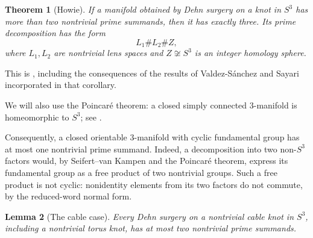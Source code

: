 \documentclass[11pt]{article}
\newtheorem{theorem}{Theorem}
\newtheorem{lemma}[theorem]{Lemma}
\begin{document}
\begin{theorem}[Howie]\label{thm:three}
If a manifold obtained by Dehn surgery on a knot in \(S^3\) has more
than two nontrivial prime summands, then it has exactly three.
Its prime decomposition has the form
\[
    L_1\#L_2\# Z,
\]
where \(L_1,L_2\) are nontrivial lens spaces and \(Z\not\cong S^3\) is
an integer homology sphere.
\end{theorem}

This is \cite[Corollary~5.3]{Howie}, including the consequences of the
results of Valdez-S\'anchez and Sayari incorporated in that corollary.


We will also use the Poincar\'e theorem: a closed simply connected
\(3\)-manifold is homeomorphic to \(S^3\); see \cite{MorganTian}.


Consequently, a closed orientable \(3\)-manifold with cyclic
fundamental group has at most one nontrivial prime summand.
Indeed, a decomposition into two non-\(S^3\) factors would, by
Seifert--van Kampen and the Poincar\'e theorem, express its fundamental
group as a free product of two nontrivial groups. Such a free product
is not cyclic: nonidentity elements from its two factors do not
commute, by the reduced-word normal form.

\begin{lemma}[The cable case]\label{lem:cable}
Every Dehn surgery on a nontrivial cable knot in \(S^3\), including a
nontrivial torus knot, has at most two nontrivial prime summands.
\end{lemma}

\end{document}
